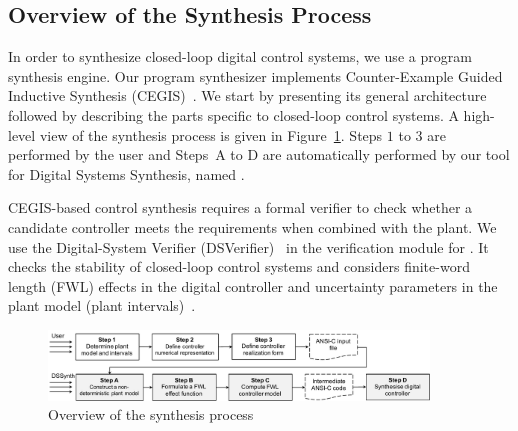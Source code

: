 \documentclass[final]{sig-alternate-05-2015}
\begin{document}
\subsection{Overview of the Synthesis Process}
\label{verification-flow}

In order to synthesize closed-loop digital control systems, we use a program
synthesis engine.  Our program synthesizer implements Counter-Example Guided
Inductive Synthesis (CEGIS)~\cite{sketch}.  We start by presenting its
general architecture followed by describing the parts specific to
closed-loop control systems.  A high-level view of the synthesis process is
given in Figure~\ref{DSSynth_process}.  Steps $1$ to $3$ are performed by
the user and Steps~A to D are automatically performed by our tool for
Digital Systems Synthesis, named \tool.

CEGIS-based control synthesis requires a formal verifier to check whether a
candidate controller meets the requirements when combined with the plant. 
We use the Digital-System Verifier (DSVerifier)~\cite{IsmailBCFF15} in the
verification module for \tool.  It checks the stability of closed-loop control systems and
considers finite-word length (FWL) effects in the digital controller and
uncertainty parameters in the plant model (plant intervals)~\cite{Bessa16}.   

%

\begin{figure}[t]
\centering
\includegraphics[width=0.9\textwidth]{figures/synthesis-flow.pdf}
\vspace{0.1cm}
\caption{Overview of the synthesis process\label{DSSynth_process}}
\end{figure}

\end{document}
